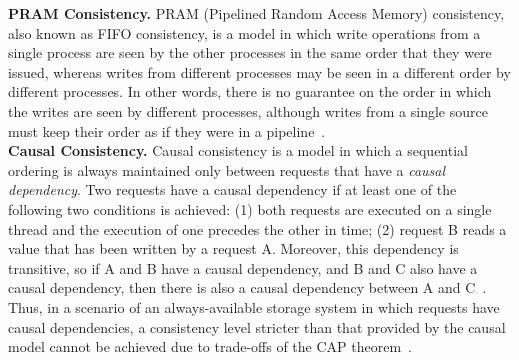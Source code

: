 \noindent \textbf{PRAM Consistency.}
PRAM (Pipelined Random Access Memory) consistency, also known as FIFO consistency, is a model in which write operations from a single process are seen by the other processes in the same order that they were issued, whereas writes from different processes may be seen in a different order by different processes. In other words, there is no guarantee on the order in which the writes are seen by different processes, although writes from a single source must keep their order as if they were in a pipeline~\cite{lipton1988pram,tanenbaum:2007}. \\

\noindent \textbf{Causal Consistency.}
Causal consistency is a mod\-el in which a sequential ordering is always maintained only between requests that have a \textit{causal dependency}. Two requests have a causal dependency if at least one of the following two conditions is achieved: (1) both requests are executed on a single thread and the execution of one precedes the other in time; (2) request B reads a value that has been written by a request A. Moreover, this dependency is transitive, so if A and B have a causal dependency, and B and C also have a causal dependency, then there is also a causal dependency between A and C~\cite{tanenbaum:2007,Vogels:2009}.
Thus, in a scenario of an always-available storage system in which requests have causal dependencies, a consistency level stricter than that provided by the causal model cannot be achieved due to trade-offs of the CAP theorem~\cite{mahajan2011consistency}. \\


